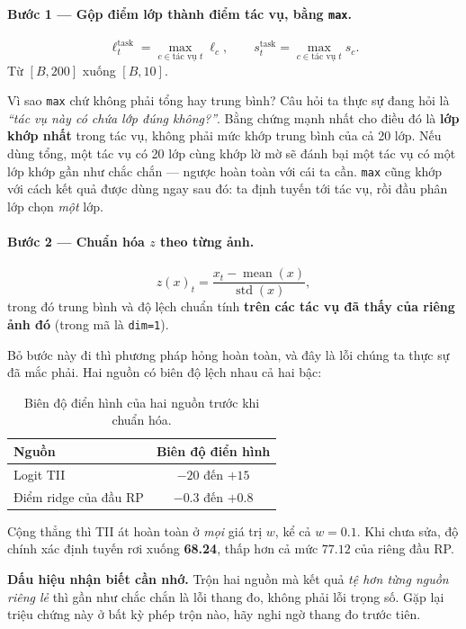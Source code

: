 \documentclass[11pt,a4paper]{article}
\newenvironment{luuy}{\begin{leftbar}\noindent\ignorespaces}{\end{leftbar}}
\begin{document}
\paragraph{Bước 1 --- Gộp điểm lớp thành điểm tác vụ, bằng \texttt{max}.}
\[ \ell^{\mathrm{task}}_t = \max_{c \in \text{tác vụ } t} \ell_c,
   \qquad
   s^{\mathrm{task}}_t = \max_{c \in \text{tác vụ } t} s_c . \]
Từ $[B, 200]$ xuống $[B, 10]$.

Vì sao \texttt{max} chứ không phải tổng hay trung bình? Câu hỏi ta thực sự đang
hỏi là \emph{``tác vụ này có chứa lớp đúng không?''}. Bằng chứng mạnh nhất cho
điều đó là \textbf{lớp khớp nhất} trong tác vụ, không phải mức khớp trung bình
của cả 20 lớp. Nếu dùng tổng, một tác vụ có 20 lớp cùng khớp lờ mờ sẽ đánh bại
một tác vụ có một lớp khớp gần như chắc chắn --- ngược hoàn toàn với cái ta cần.
\texttt{max} cũng khớp với cách kết quả được dùng ngay sau đó: ta định tuyến tới
tác vụ, rồi đầu phân lớp chọn \emph{một} lớp.

\paragraph{Bước 2 --- Chuẩn hóa $z$ theo từng ảnh.}
\[ z(x)_t = \frac{x_t - \operatorname{mean}(x)}{\operatorname{std}(x)} , \]
trong đó trung bình và độ lệch chuẩn tính \textbf{trên các tác vụ đã thấy của
riêng ảnh đó} (trong mã là \texttt{dim=1}).

Bỏ bước này đi thì phương pháp hỏng hoàn toàn, và đây là lỗi chúng ta thực sự đã
mắc phải. Hai nguồn có biên độ lệch nhau cả hai bậc:

\begin{table}[htbp]
\centering
\caption{Biên độ điển hình của hai nguồn trước khi chuẩn hóa.}
\label{tab:bien-do}
\begin{tabular}{@{}lc@{}}
\toprule
Nguồn & Biên độ điển hình \\
\midrule
Logit TII & $-20$ đến $+15$ \\
Điểm ridge của đầu RP & $-0.3$ đến $+0.8$ \\
\bottomrule
\end{tabular}
\end{table}

Cộng thẳng thì TII át hoàn toàn ở \emph{mọi} giá trị $w$, kể cả $w = 0.1$. Khi
chưa sửa, độ chính xác định tuyến rơi xuống \textbf{68.24}, thấp hơn cả mức
$77.12$ của riêng đầu RP.

\begin{luuy}
\textbf{Dấu hiệu nhận biết cần nhớ.} Trộn hai nguồn mà kết quả \emph{tệ hơn từng
nguồn riêng lẻ} thì gần như chắc chắn là lỗi thang đo, không phải lỗi trọng số.
Gặp lại triệu chứng này ở bất kỳ phép trộn nào, hãy nghi ngờ thang đo trước tiên.
\end{luuy}
\end{document}

